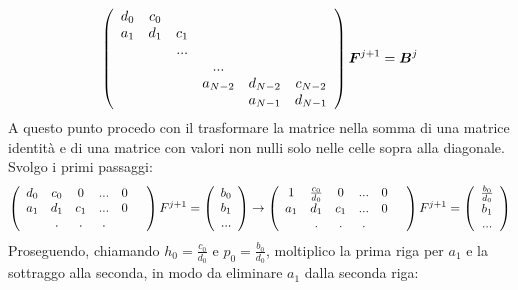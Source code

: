 \begin{equation}
  \left( \begin{array}{cccccc}
      d_0&c_0&&&\\
      a_1&d_1&c_1&\\
      &&...&&&\\
      &&&...&&\\
      &&&a_{N-2}&d_{N-2}&c_{N-2}\\
      &&&&a_{N-1}&d_{N-1}\\
  \end{array} \right) \boldsymbol{F}^{j+1} = 
  \boldsymbol{B}^j
\end{equation}
A questo punto procedo con il trasformare la matrice nella somma di una matrice identit\`a e di una matrice con valori non nulli solo nelle celle sopra alla diagonale. Svolgo i primi passaggi:
\begin{equation}
  \left( \begin{array}{cccccc}
      d_0&c_0&0&...&0\\
      a_1&d_1&c_1&...&0\\
      &.&.&.&&\\
  \end{array} \right) F^{j+1} = \left( \begin{array}{c}
      b_0\\b_1\\...
  \end{array} \right)\to
  \left( \begin{array}{cccccc}
      1&\frac{c_0}{d_0}&0&...&0\\
      a_1&d_1&c_1&...&0\\
      &.&.&.&&\\
  \end{array} \right) F^{j+1} = \left( \begin{array}{c}
      \frac{b_0}{d_0}\\b_1\\...
  \end{array} \right)
\end{equation}
Proseguendo, chiamando $h_0 = \frac{c_0}{d_0}$ e $p_0 = \frac{b_0}{d_0}$, moltiplico la prima riga per $a_1$ e la sottraggo alla seconda, in modo da eliminare $a_1$ dalla seconda riga:
